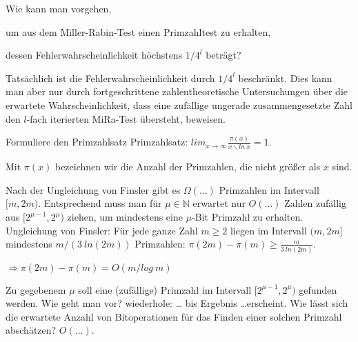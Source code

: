 \documentclass[avery5371, frame]{flashcards}
\begin{document}
\begin{flashcard}[Primzahlen]{Wie kann man vorgehen,

        um aus dem Miller-Rabin-Test einen Primzahltest zu erhalten,

        dessen Fehlerwahrscheinlichkeit höchstens $1/4^l$ beträgt?}
    Tatsächlich ist die Fehlerwahrscheinlichkeit durch $1/4^l$ beschränkt. Dies kann man aber nur durch fortgeschrittene zahlentheoretische Untersuchungen über die erwartete Wahrscheinlichkeit, dass eine zufällige ungerade zusammengesetzte Zahl den $l$-fach iterierten MiRa-Test übersteht, beweisen.
\end{flashcard}

\begin{flashcard}[Primzahlen]{Formuliere den Primzahlsatz}
    Primzahlsatz: $lim_{x\rightarrow \infty} \frac{\pi(x)}{x\backslash ln\ x}= 1$.

    Mit $\pi(x)$ bezeichnen wir die Anzahl der Primzahlen, die nicht größer als $x$ sind.
\end{flashcard}

\begin{flashcard}[Primzahlen]{Nach der Ungleichung von Finsler gibt es $\Omega(\dots)$ Primzahlen im Intervall $[m, 2m)$. Entsprechend muss man für $\mu\in\mathbb{N}$ erwartet nur $O(\dots)$ Zahlen zufällig aus $[2^{\mu-1}, 2^{\mu})$ ziehen, um mindestens eine $\mu$-Bit Primzahl zu erhalten.}
                    Ungleichung von Finsler: Für jede ganze Zahl $m\geq 2$ liegen im Intervall $(m, 2m]$ mindestens $m/(3\ ln(2m))$ Primzahlen: $\pi (2m)-\pi(m)\geq \frac{m}{3\ ln(2m)}$.

    $\Rightarrow \pi(2m)-\pi(m) = O(m/log\ m)$
\end{flashcard}

\begin{flashcard}[Primzahlen]{Zu gegebenem $\mu$ soll eine (zufällige) Primzahl im Intervall $[2^{\mu-1}, 2^{\mu})$ gefunden werden. Wie geht man vor?}
    wiederhole: \dots
    bis Ergebnis \dots erscheint.
    Wie lässt sich die erwartete Anzahl von Bitoperationen für das Finden einer solchen Primzahl abschätzen? $O(\dots)$.
\end{flashcard}
\end{document}
